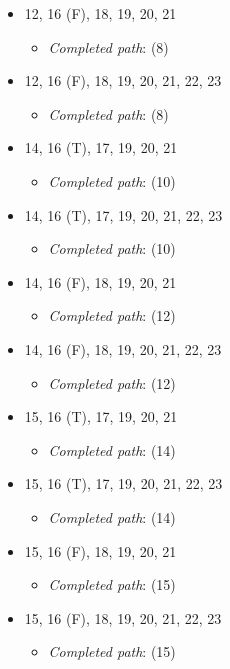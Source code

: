 \documentclass{article}
\newcommand{\completedpath}{\textit{Completed path}}
\begin{document}
\begin{itemize}
\begin{itemize}
          \end{itemize}
    \item 12, 16 (F), 18, 19, 20, 21
          \begin{itemize}
              \item \completedpath: (8)
          \end{itemize}
    \item 12, 16 (F), 18, 19, 20, 21, 22, 23
          \begin{itemize}
              \item \completedpath: (8)
          \end{itemize}
    \item 14, 16 (T), 17, 19, 20, 21
          \begin{itemize}
              \item \completedpath: (10)
          \end{itemize}
    \item 14, 16 (T), 17, 19, 20, 21, 22, 23
          \begin{itemize}
              \item \completedpath: (10)
          \end{itemize}
    \item 14, 16 (F), 18, 19, 20, 21
          \begin{itemize}
              \item \completedpath: (12)
          \end{itemize}
    \item 14, 16 (F), 18, 19, 20, 21, 22, 23
          \begin{itemize}
              \item \completedpath: (12)
          \end{itemize}
    \item 15, 16 (T), 17, 19, 20, 21
          \begin{itemize}
              \item \completedpath: (14)
          \end{itemize}
    \item 15, 16 (T), 17, 19, 20, 21, 22, 23
          \begin{itemize}
              \item \completedpath: (14)
          \end{itemize}
    \item 15, 16 (F), 18, 19, 20, 21
          \begin{itemize}
              \item \completedpath: (15)
          \end{itemize}
    \item 15, 16 (F), 18, 19, 20, 21, 22, 23
          \begin{itemize}
              \item \completedpath: (15)
          \end{itemize}
\end{itemize}
\end{document}
